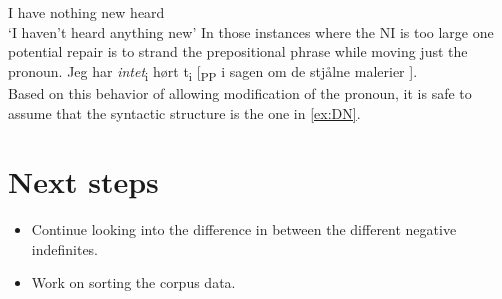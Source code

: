 \documentclass[12pt, letterpaper]{article}
\begin{document}
	I have nothing new heard\\
	\glt `I haven't heard anything new'
	\z
\ex In those instances where the NI is too large one potential repair is to strand the prepositional phrase while moving just the pronoun.
	\ea Jeg har \textit{intet}\textsubscript{i} hørt t\textsubscript{i} [\textsubscript{PP} i sagen om de stjålne malerier ].\\
	\z   
\ex Based on this behavior of allowing modification of the pronoun, it is safe to assume that the syntactic structure is the one in \ref{ex:DN}.
\z

\section{Next steps} \label{sec:NEXT}
\begin{itemize}
	\item Continue looking into the difference in between the different negative indefinites.
	\item Work on sorting the corpus data.
\end{itemize}



\printbibliography
\end{document}
